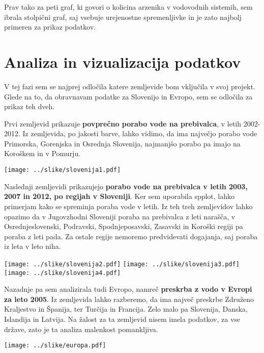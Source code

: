 \documentclass[11pt,a4paper]{article}
\begin{document}
Prav tako za peti graf, ki govori o kolicina arzenika v vodovodnih sistemih, sem ibrala stolpični graf, saj vsebuje urejenostne spremenljivke in je zato najbolj primeren za prikaz podatkov.



\section{Analiza in vizualizacija podatkov}

V tej fazi sem se najprej odločila katere zemljevide bom vključila v svoj projekt. Glede na to, da obravnavam podatke za Slovenijo in Evropo, sem se odločila za prikaz teh dveh.
\vspace{5mm} 

Prvi zemljevid prikazuje \textbf{povprečno porabo vode na prebivalca}, v letih 2002-2012. Iz zemljevida, po jakosti barve, lahko vidimo, da ima največjo porabo vode Primorska, Gorenjska in Osrednja Slovenija, najmanjšo porabo pa imajo na Koroškem in v Pomurju.

\texttt{[image: ../slike/slovenija1.pdf]}

\newpage
Naslednji zemljevidi prikazujejo \textbf{porabo vode na prebivalca v letih 2003, 2007 in 2012, po regijah v Sloveniji}. Ker sem uporabila spplot, lahko primerjam kako se spreminja poraba vode v letih. Iz teh treh zemljevidov lahko opazimo da v Jugovzhodni Sloveniji poraba na prebivalca z leti narašča, v Osrednjeslovenski, Podravski, Spodnjeposavski, Zasavski in Koroški regiji pa poraba z leti pada. Za ostale regije nemoremo predvidevati dogajanja, saj poraba iz leta v leto niha. 


\texttt{[image: ../slike/slovenija2.pdf]}
\vspace{5mm} 
\texttt{[image: ../slike/slovenija3.pdf]}
\vspace{5mm} 
\texttt{[image: ../slike/slovenija4.pdf]}

\newpage
Nazadnje pa sem analizirala tudi Evropo, namreč \textbf{preskrba z vodo v Evropi za leto 2005}. Iz zemljevida lahko razberemo, da ima največ preskrbe Združeno Kraljestvo in Španija, ter Turčija in Francija. Zelo malo pa Slovenija, Danska, Islandija in Latvija. Na žalost za ta zemljevid nisem imela podatkov, za vse države, zato je ta analiza malenkost pomankljiva.

\texttt{[image: ../slike/europa.pdf]}




% 
% 
\end{document}

